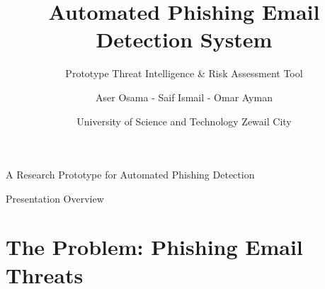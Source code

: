 \documentclass[aspectratio=169]{beamer}
\title{Automated Phishing Email Detection System}
\subtitle{Prototype Threat Intelligence \& Risk Assessment Tool}
\author{Aser Osama - Saif Ismail - Omar Ayman}
\date{University of Science and Technology Zewail City}
\institute{October 2025}
\begin{document}
\begin{frame}[plain]
\vspace*{-0.7cm}
\titlepage
\vspace*{-0.7cm}
\begin{center}
\scriptsize{A Research Prototype for Automated Phishing Detection}
\end{center}
\end{frame}

\begin{frame}{Presentation Overview}
\vspace{0.6cm}
\small
\tableofcontents
\vfill
\end{frame}

\section{The Problem: Phishing Email Threats}
\end{document}
